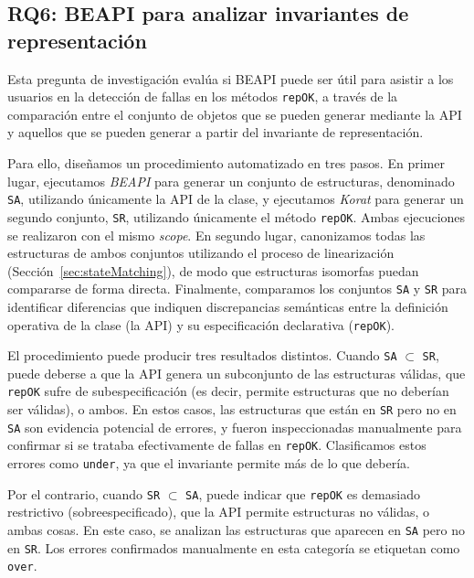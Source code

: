 


\subsection{RQ6: BEAPI para analizar invariantes de representación}
\label{sec:existing-specs-analysis}

Esta pregunta de investigación evalúa si \textsf{BEAPI} puede ser útil para asistir a los usuarios 
en la detección de fallas en los métodos \texttt{repOK}, a través de la comparación entre el conjunto 
de objetos que se pueden generar mediante la API y aquellos que se pueden generar a partir del 
invariante de representación.

Para ello, diseñamos un procedimiento automatizado en tres pasos. En primer lugar, ejecutamos 
\emph{BEAPI} para generar un conjunto de estructuras, denominado \texttt{SA}, utilizando únicamente 
la API de la clase, y ejecutamos \emph{Korat} para generar un segundo conjunto, \texttt{SR}, 
utilizando únicamente el método \texttt{repOK}. Ambas ejecuciones se realizaron con el mismo 
\emph{scope}. En segundo lugar, canonizamos todas las estructuras de ambos conjuntos utilizando el 
proceso de linearización (Sección~\ref{sec:stateMatching}), de modo que estructuras isomorfas puedan 
compararse de forma directa. Finalmente, comparamos los conjuntos \texttt{SA} y \texttt{SR} para 
identificar diferencias que indiquen discrepancias semánticas entre la definición operativa de la 
clase (la API) y su especificación declarativa (\texttt{repOK}).

El procedimiento puede producir tres resultados distintos. Cuando \texttt{SA} $\subset$ \texttt{SR}, 
puede deberse a que la API genera un subconjunto de las estructuras válidas, que \texttt{repOK} 
sufre de subespecificación (es decir, permite estructuras que no deberían ser válidas), o ambos. 
En estos casos, las estructuras que están en \texttt{SR} pero no en \texttt{SA} son evidencia potencial 
de errores, y fueron inspeccionadas manualmente para confirmar si se trataba efectivamente de fallas 
en \texttt{repOK}. Clasificamos estos errores como \texttt{under}, ya que el invariante permite más 
de lo que debería.

Por el contrario, cuando \texttt{SR} $\subset$ \texttt{SA}, puede indicar que \texttt{repOK} es demasiado 
restrictivo (sobreespecificado), que la API permite estructuras no válidas, o ambas cosas. En este 
caso, se analizan las estructuras que aparecen en \texttt{SA} pero no en \texttt{SR}. Los errores 
confirmados manualmente en esta categoría se etiquetan como \texttt{over}.

